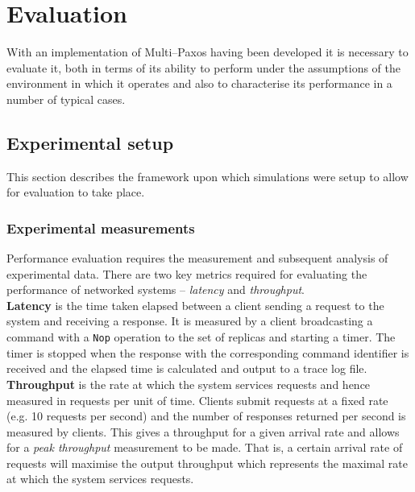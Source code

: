 \chapter{Evaluation}

With an implementation of Multi--Paxos having been developed it is necessary to evaluate it, both in terms of its ability to perform under the assumptions of the environment in which it operates and also to characterise its performance in a number of typical cases.


\section{Experimental setup}
\label{section:setup}

This section describes the framework upon which simulations were setup to allow for evaluation to take place.

\subsection{Experimental measurements}

Performance evaluation requires the measurement and subsequent analysis of experimental data. There are two key metrics required for evaluating the performance of networked systems -- \emph{latency} and \emph{throughput}. \\

\textbf{Latency} is the time taken elapsed  between a client sending a request to the system and receiving a response. It is measured by a client broadcasting a command with a \texttt{Nop} operation to the set of replicas and starting a timer. The timer is stopped when the response with the corresponding command identifier is received and the elapsed time is calculated and output to a trace log file. \\

\textbf{Throughput} is the rate at which the system services requests and hence measured in requests per unit of time. Clients submit requests at a fixed rate (e.g. 10 requests per second) and the number of responses returned per second is measured by clients. This gives a throughput for a given arrival rate and allows for a \emph{peak throughput} measurement to be made. That is, a certain arrival rate of requests will maximise the output throughput which represents the maximal rate at which the system services requests. \\

